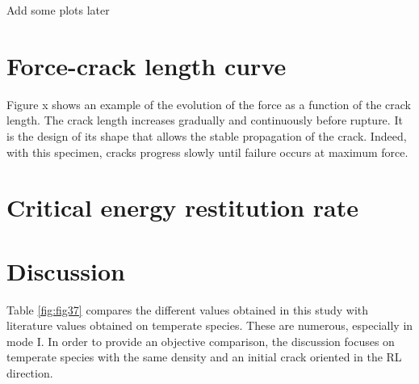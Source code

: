 Add some plots later

\section{Force-crack length curve}

Figure x shows an example of the evolution of the force as a function of the crack length. The crack length increases gradually and continuously before rupture. It is the design of its shape that allows the stable propagation of the crack. Indeed, with this specimen, cracks progress slowly until failure occurs at maximum force.

\section{Critical energy restitution rate}

\section{Discussion}

Table \ref{fig:fig37} compares the different values obtained in this study with literature values obtained on temperate species. These are numerous, especially in mode I. In order to provide an objective comparison, the discussion focuses on temperate species with the same density and an initial crack oriented in the RL direction.


